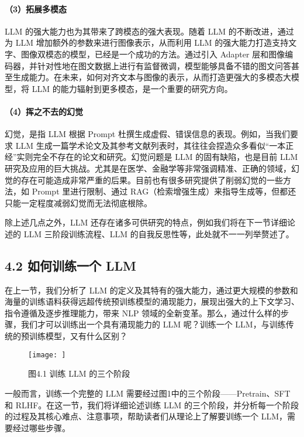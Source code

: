 \documentclass[
]{article}
\begin{document}
\paragraph{（3）拓展多模态}\label{ux62d3ux5c55ux591aux6a21ux6001}

LLM 的强大能力也为其带来了跨模态的强大表现。随着 LLM 的不断改进，通过为
LLM 增加额外的参数来进行图像表示，从而利用 LLM
的强大能力打造支持文字、图像双模态的模型，已经是一个成功的方法。通过引入
Adapter
层和图像编码器，并针对性地在图文数据上进行有监督微调，模型能够具备不错的图文问答甚至生成能力。在未来，如何对齐文本与图像的表示，从而打造更强大的多模态大模型，将
LLM 的能力辐射到更多模态，是一个重要的研究方向。

\paragraph{（4）挥之不去的幻觉}\label{ux6325ux4e4bux4e0dux53bbux7684ux5e7bux89c9}

幻觉，是指 LLM 根据 Prompt
杜撰生成虚假、错误信息的表现。例如，当我们要求 LLM
生成一篇学术论文及其参考文献列表时，其往往会捏造众多看似``一本正经''实则完全不存在的论文和研究。幻觉问题是
LLM 的固有缺陷，也是目前 LLM
研究及应用的巨大挑战。尤其是在医学、金融学等非常强调精准、正确的领域，幻觉的存在可能造成非常严重的后果。目前也有很多研究提供了削弱幻觉的一些方法，如
Prompt 里进行限制、通过
RAG（检索增强生成）来指导生成等，但都还只能一定程度减弱幻觉而无法彻底根除。

除上述几点之外，LLM
还存在诸多可供研究的特点，例如我们将在下一节详细论述的 LLM
三阶段训练流程、LLM 的自我反思性等，此处就不一一列举赘述了。

\subsection{4.2 如何训练一个
LLM}\label{ux5982ux4f55ux8badux7ec3ux4e00ux4e2a-llm}

在上一节，我们分析了 LLM
的定义及其特有的强大能力，通过更大规模的参数和海量的训练语料获得远超传统预训练模型的涌现能力，展现出强大的上下文学习、指令遵循及逐步推理能力，带来
NLP
领域的全新变革。那么，通过什么样的步骤，我们才可以训练出一个具有涌现能力的
LLM 呢？训练一个 LLM，与训练传统的预训练模型，又有什么区别？

\begin{figure}[htbp]\centering
\texttt{[image: ]}
\caption{图4.1 训练 LLM 的三个阶段}
\end{figure}

一般而言，训练一个完整的 LLM 需要经过图1中的三个阶段------Pretrain、SFT
和 RLHF。在这一节，我们将详细论述训练 LLM
的三个阶段，并分析每一个阶段的过程及其核心难点、注意事项，帮助读者们从理论上了解要训练一个
LLM，需要经过哪些步骤。
\end{document}
